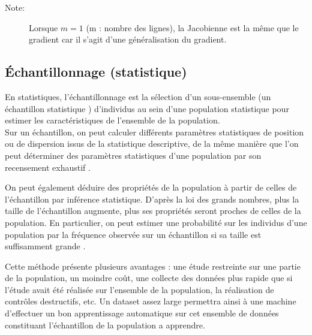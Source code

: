 \begin{description}
	\item[Note:] Lorsque $m=1$ (m : nombre des lignes), la Jacobienne est la même que le gradient car il s'agit d'une généralisation du gradient.
\end{description}





		

\subsection{Échantillonnage (statistique)} \label{sec:chantillonnage} %


En statistiques, l'échantillonnage est la sélection d'un sous-ensemble (un échantillon statistique ) d'individus au sein d'une population statistique pour estimer les caractéristiques de l'ensemble de la population. \\
Sur un échantillon, on peut calculer différents paramètres statistiques de position ou de dispersion issus de la statistique descriptive, de la même manière que l'on peut déterminer des paramètres statistiques d'une population par son recensement exhaustif \cite{sarndal2003model}.

On peut également déduire des propriétés de la population à partir de celles de l'échantillon par inférence statistique. D'après la loi des grands nombres, plus la taille de l'échantillon augmente, plus ses propriétés seront proches de celles de la population. En particulier, on peut estimer une probabilité sur les individus d'une population par la fréquence observée sur un échantillon si sa taille est suffisamment grande \cite{sarndal2003model, harrell2001regression}. 

Cette méthode présente plusieurs avantages : une étude restreinte sur une partie de la population, un moindre coût, une collecte des données plus rapide que si l'étude avait été réalisée sur l'ensemble de la population, la réalisation de contrôles destructifs, etc.
Un dataset assez large permettra ainsi  à une machine d'effectuer un bon apprentissage automatique sur cet ensemble de données constituant l'échantillon de la population a apprendre.

